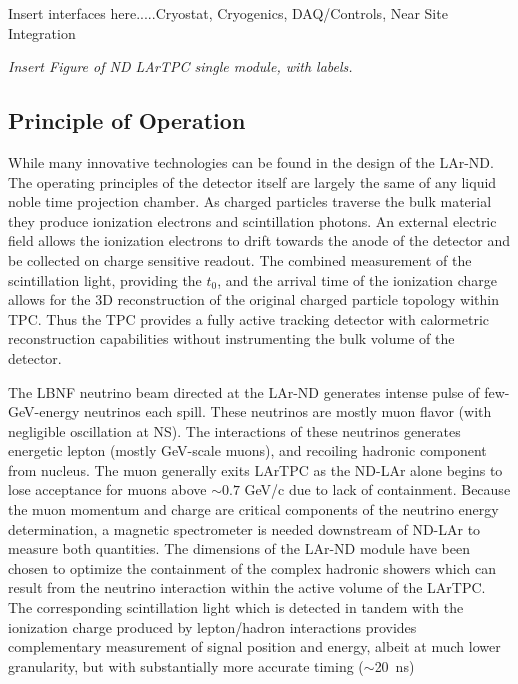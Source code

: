Insert interfaces here.....Cryostat, Cryogenics, DAQ/Controls, Near Site Integration


{\it Insert Figure of ND LArTPC single module, with labels.}


\subsection{Principle of Operation}\label{sec:lartpc-ovvw-op}

While many innovative technologies can be found in the design of the LAr-ND. The operating principles of the detector itself are largely the same of any liquid noble time projection chamber. As charged particles traverse the bulk material they produce ionization electrons and scintillation photons. An external electric field allows the ionization electrons to drift towards the anode of the detector and be collected on charge sensitive readout. The combined measurement of the scintillation light, providing the $t_0$, and the arrival time of the ionization charge allows for the 3D reconstruction of the original charged particle topology within TPC. Thus the TPC provides a fully active tracking detector with calormetric reconstruction capabilities without instrumenting the bulk volume of the detector.

The LBNF neutrino beam directed at the LAr-ND generates intense pulse of few-GeV-energy neutrinos each spill. These neutrinos are mostly muon flavor (with negligible oscillation at NS). The interactions of these neutrinos generates energetic lepton (mostly GeV-scale muons), and recoiling hadronic component from nucleus. The muon generally exits LArTPC as the ND-LAr alone begins to lose acceptance for muons above $\sim0.7$ GeV/c due to lack of containment. Because the muon momentum and charge are critical components of the neutrino energy determination, a magnetic spectrometer is needed downstream of ND-LAr to measure both quantities. The dimensions of the LAr-ND module have been chosen to optimize the containment of the complex hadronic showers which can result from the neutrino interaction within the active volume of the LArTPC. The corresponding scintillation light which is detected in tandem with the ionization charge produced by lepton/hadron interactions provides complementary measurement of signal position and energy, albeit at much lower granularity, but with substantially more accurate timing ($\sim$20~ns)

